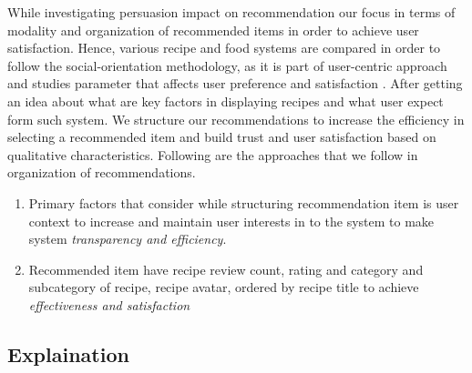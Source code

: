 While investigating persuasion impact on recommendation our focus in terms of modality and organization of recommended items in order to achieve user satisfaction.  Hence, various recipe and food systems are compared in order to follow the social-orientation methodology, as it is part of user-centric approach and studies parameter that affects user preference and satisfaction \cite{ swearingen2002interaction}. After getting an idea about what are key factors in displaying recipes and what user expect form such system.  We structure our recommendations to increase the efficiency in selecting a recommended item and build trust and user satisfaction based on qualitative characteristics. Following are the approaches that we follow in organization of recommendations.

\begin{enumerate}
	\item Primary factors that consider while structuring recommendation item is user context to increase and maintain user interests in to the system to make system \textit{transparency and efficiency}. 
	
	\item Recommended item have recipe review count, rating and category and subcategory of recipe, recipe avatar, ordered by recipe title to achieve \textit{ effectiveness and satisfaction}
\end{enumerate}

\subsection{Explaination}

